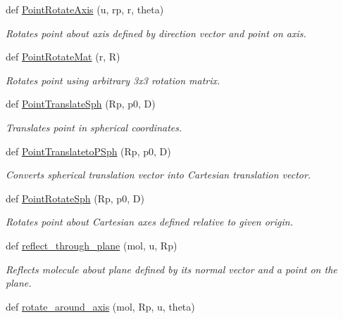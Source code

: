\begin{DoxyCompactItemize}
def \hyperlink{namespacemolSimplify_1_1Scripts_1_1geometry_ab7f86efbae768b9ed6edfeff4598616b}{Point\+Rotate\+Axis} (u, rp, r, theta)
\begin{DoxyCompactList}\small\item\em Rotates point about axis defined by direction vector and point on axis. \end{DoxyCompactList}\item 
def \hyperlink{namespacemolSimplify_1_1Scripts_1_1geometry_a6c0a734cc984286ef7a9b58d61065a17}{Point\+Rotate\+Mat} (r, R)
\begin{DoxyCompactList}\small\item\em Rotates point using arbitrary 3x3 rotation matrix. \end{DoxyCompactList}\item 
def \hyperlink{namespacemolSimplify_1_1Scripts_1_1geometry_ad39ef08129915708a2ba644855c324ab}{Point\+Translate\+Sph} (Rp, p0, D)
\begin{DoxyCompactList}\small\item\em Translates point in spherical coordinates. \end{DoxyCompactList}\item 
def \hyperlink{namespacemolSimplify_1_1Scripts_1_1geometry_a05bad44739a2ebd5679d059f3d0084b8}{Point\+Translateto\+P\+Sph} (Rp, p0, D)
\begin{DoxyCompactList}\small\item\em Converts spherical translation vector into Cartesian translation vector. \end{DoxyCompactList}\item 
def \hyperlink{namespacemolSimplify_1_1Scripts_1_1geometry_aeacb625442bc7c0d1d4fac98696a0cb1}{Point\+Rotate\+Sph} (Rp, p0, D)
\begin{DoxyCompactList}\small\item\em Rotates point about Cartesian axes defined relative to given origin. \end{DoxyCompactList}\item 
def \hyperlink{namespacemolSimplify_1_1Scripts_1_1geometry_ad14edfe334bcb81ff7f4de4dfd630fc7}{reflect\+\_\+through\+\_\+plane} (mol, u, Rp)
\begin{DoxyCompactList}\small\item\em Reflects molecule about plane defined by its normal vector and a point on the plane. \end{DoxyCompactList}\item 
def \hyperlink{namespacemolSimplify_1_1Scripts_1_1geometry_a90caa7a6dc952df17fce36ea2711eff3}{rotate\+\_\+around\+\_\+axis} (mol, Rp, u, theta)

\end{DoxyCompactItemize}
